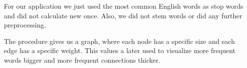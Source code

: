 For our application we  just used the most common English words as stop words and did not calculate new once. Also, we did not stem words or did any further preprocessing.


The procedure gives us a graph, where each node has a specific size and each edge has a specific weight. This values a later used to visualize more frequent words bigger and more frequent connections thicker. 






